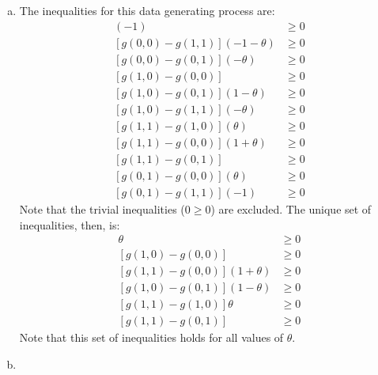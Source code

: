 \documentclass{article}
\begin{document}
\begin{enumerate}[(a)]
    \item The inequalities for this data generating process are:\begin{align*}
        [g(0, 0) - g(1, 0)](-1)         &\geq 0 \\
        [g(0, 0) - g(1, 1)](-1 -\theta) &\geq 0 \\
        [g(0, 0) - g(0, 1)](- \theta)   &\geq 0 \\
        [g(1, 0) - g(0, 0)]             &\geq 0 \\
        [g(1, 0) - g(0, 1)](1 - \theta) &\geq 0 \\
        [g(1, 0) - g(1, 1)](- \theta)   &\geq 0 \\
        [g(1, 1) - g(1, 0)](\theta)     &\geq 0 \\
        [g(1, 1) - g(0, 0)](1 + \theta) &\geq 0 \\
        [g(1, 1) - g(0, 1)]             &\geq 0 \\
        [g(0, 1) - g(0, 0)](\theta)     &\geq 0 \\
        [g(0, 1) - g(1, 1)](-1)         &\geq 0 
    \end{align*}
    Note that the trivial inequalities ($0\geq 0$) are excluded. The unique set of inequalities, then, is:\begin{align}
        [g(0, 1) - g(0, 0)]\theta       &\geq 0 \\
        [g(1, 0) - g(0, 0)]             &\geq 0 \\
        [g(1, 1) - g(0, 0)](1 + \theta) &\geq 0 \\
        [g(1, 0) - g(0, 1)](1 - \theta) &\geq 0 \\
        [g(1, 1) - g(1, 0)]\theta       &\geq 0 \\
        [g(1, 1) - g(0, 1)]             &\geq 0 
    \end{align}
    Note that this set of inequalities holds for all values of $\theta$. 

    \item %
    
    

\end{enumerate}
\end{document}
